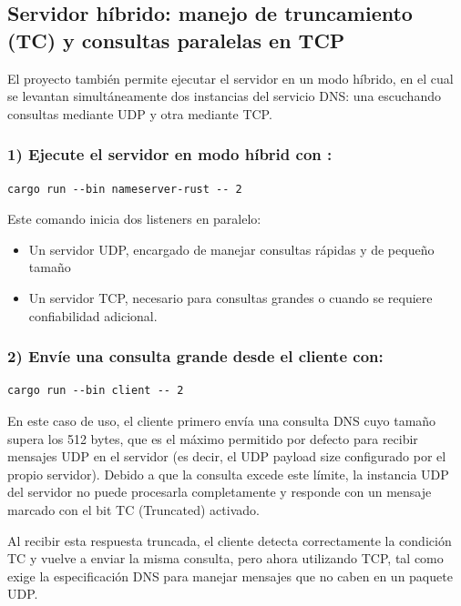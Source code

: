 \subsection{Servidor híbrido: manejo de truncamiento (TC) y consultas paralelas en TCP}

El proyecto también permite ejecutar el servidor en un modo híbrido, en el cual se levantan simultáneamente dos instancias del servicio DNS: una escuchando consultas mediante UDP y otra mediante TCP.

\subsubsection{1) Ejecute el servidor en modo híbrid con :}

\begin{lstlisting}
cargo run --bin nameserver-rust -- 2
\end{lstlisting}

Este comando inicia dos listeners en paralelo:

\begin{itemize}
    \item Un servidor UDP, encargado de manejar consultas rápidas y de pequeño tamaño
    \item Un servidor TCP, necesario para consultas grandes o cuando se requiere confiabilidad adicional.
\end{itemize}

\subsubsection{2) Envíe una consulta grande desde el cliente con:}

\begin{lstlisting}
cargo run --bin client -- 2
\end{lstlisting}

En este caso de uso, el cliente primero envía una consulta DNS cuyo tamaño supera los 512 bytes, que es el máximo permitido por defecto para recibir mensajes UDP en el servidor 
(es decir, el UDP payload size configurado por el propio servidor). Debido a que la consulta excede este límite, la instancia UDP del servidor no puede procesarla completamente y responde con 
un mensaje marcado con el bit TC (Truncated) activado.

Al recibir esta respuesta truncada, el cliente detecta correctamente la condición TC y vuelve a enviar la misma consulta, pero ahora utilizando TCP, tal como exige la especificación DNS para manejar 
mensajes que no caben en un paquete UDP.

